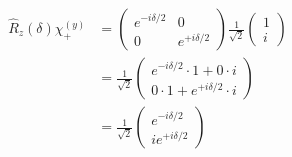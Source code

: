 \documentclass{article}
\begin{document}
\begin{enumerate}[label=(\alph*)]
  \begin{align*}
    \hat{R}_z(\delta)\chi_+^{(y)} &= \begin{pmatrix}
      e^{- i \delta /2 } & 0 \\
      0 & e^{+i \delta / 2}
    \end{pmatrix} \frac{1}{\sqrt{2}}\begin{pmatrix}
      1 \\ i
    \end{pmatrix} \\
    &= \frac{1}{\sqrt{2}} \begin{pmatrix}
      e^{-i\delta / 2} \cdot 1 + 0 \cdot i \\
      0 \cdot 1 + e^{+i \delta /2} \cdot i
    \end{pmatrix} \\
    &= \frac{1}{\sqrt{2}} \begin{pmatrix}
      e^{-i\delta / 2} \\
      i e^{+i\delta / 2}
    \end{pmatrix}
  \end{align*}



\end{enumerate}
\end{document}
